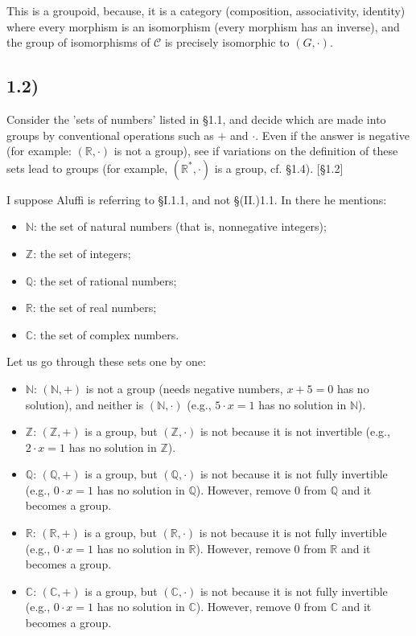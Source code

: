 This is a groupoid, because, it is a category (composition, associativity, identity) where every morphism is an isomorphism (every morphism has an inverse), and the group of isomorphisms of $\mathcal{C}$ is precisely isomorphic to $(G, \cdot)$.


\subsection*{1.2)}

Consider the 'sets of numbers' listed in §1.1, and decide which are made into groups by conventional operations such as $+$ and $\cdot$. Even if the answer is negative (for example: $(\mathbb{R}, \cdot)$ is not a group), see if variations on the definition of these sets lead to groups (for example, $(\mathbb{R}^*, \cdot)$ is a group, cf. §1.4). [§1.2]

I suppose Aluffi is referring to §I.1.1, and not §(II.)1.1. In there he mentions:

\begin{itemize}
	\item $\mathbb{N}$: the set of natural numbers (that is, nonnegative integers);
	\item $\mathbb{Z}$: the set of integers;
	\item $\mathbb{Q}$: the set of rational numbers;
	\item $\mathbb{R}$: the set of real numbers;
	\item $\mathbb{C}$: the set of complex numbers.
\end{itemize}

Let us go through these sets one by one:

\begin{itemize}
	\item $\mathbb{N}$: $(\mathbb{N}, +)$ is not a group (needs negative numbers, $x + 5 = 0$ has no solution), and neither is $(\mathbb{N}, \cdot)$ (e.g., $5 \cdot x = 1$ has no solution in $\mathbb{N}$).
	\item $\mathbb{Z}$: $(\mathbb{Z}, +)$ is a group, but $(\mathbb{Z}, \cdot)$ is not because it is not invertible (e.g., $2 \cdot x = 1$ has no solution in $\mathbb{Z}$).
	\item $\mathbb{Q}$: $(\mathbb{Q}, +)$ is a group, but $(\mathbb{Q}, \cdot)$ is not because it is not fully invertible (e.g., $0 \cdot x = 1$ has no solution in $\mathbb{Q}$). However, remove $0$ from $\mathbb{Q}$ and it becomes a group.
	\item $\mathbb{R}$: $(\mathbb{R}, +)$ is a group, but $(\mathbb{R}, \cdot)$ is not because it is not fully invertible (e.g., $0 \cdot x = 1$ has no solution in $\mathbb{R}$). However, remove $0$ from $\mathbb{R}$ and it becomes a group.
	\item $\mathbb{C}$: $(\mathbb{C}, +)$ is a group, but $(\mathbb{C}, \cdot)$ is not because it is not fully invertible (e.g., $0 \cdot x = 1$ has no solution in $\mathbb{C}$). However, remove $0$ from $\mathbb{C}$ and it becomes a group.
\end{itemize}


